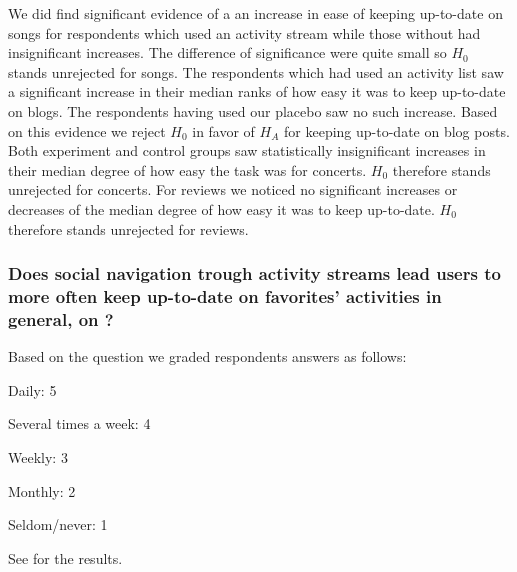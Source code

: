 \begin{items}
   We did find significant evidence
    of a an increase in ease of keeping up-to-date on songs for respondents
    which used an activity stream while those without had insignificant
    increases. The difference of significance were quite small so $H_0$
    stands unrejected for songs.
   The respondents which had used an activity list saw a
    significant increase in their median ranks of how easy it was
    to keep up-to-date on blogs. The respondents having used our placebo
    saw no such increase. Based on this evidence we reject $H_0$ in favor
    of $H_A$ for keeping up-to-date on blog posts.
   Both experiment and control groups saw
    statistically insignificant increases in their median degree of how easy
    the task was for concerts. $H_0$ therefore stands unrejected for concerts.
   For reviews we noticed no significant increases or decreases
    of the median degree of how easy it was to keep up-to-date. 
    $H_0$ therefore stands unrejected for reviews.
\end{items}

\subsubsection{%
  Does social navigation trough activity streams lead users to more often keep
  up-to-date on favorites' activities in general, on \urort{}?
}

Based on the question
we graded respondents answers as follows: 

\begin{items}
  \item Daily: 5
  \item Several times a week: 4
  \item Weekly: 3
  \item Monthly: 2
  \item Seldom/never: 1
\end{items}

See
 for the results.

